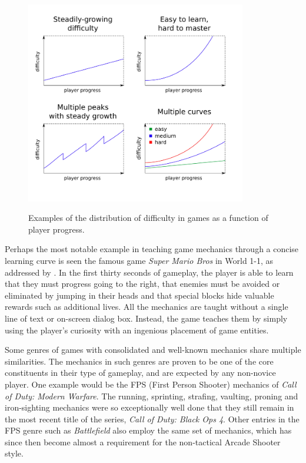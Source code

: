 \begin{figure}
    \begin{center}
    \caption{Examples of the distribution of difficulty in games as a function of player progress.}
        \includegraphics[width=26em]{figures/fig-difficulty-curves.png}
        \label{fig:difficulty-curves}
    \end{center}
\end{figure}

Perhaps the most notable example in teaching game mechanics through a concise learning curve is seen the famous game \emph{Super Mario Bros}  in World 1-1, as addressed by \citet{video_extracreditsmario11}. In the first thirty seconds of gameplay, the player is able to learn that they must progress going to the right, that enemies must be avoided or eliminated by jumping in their heads and that special blocks hide valuable rewards such as additional lives. All the mechanics are taught without a single line of text or on-screen dialog box. Instead, the game teaches them by simply using the player's curiosity with an ingenious placement of game entities.

Some genres of games with consolidated and well-known mechanics share multiple similarities. The mechanics in such genres are proven to be one of the core constituents in their type of gameplay, and are expected by any non-novice player. One example would be the FPS (First Person Shooter) mechanics of \emph{Call of Duty: Modern Warfare}. The running, sprinting, strafing, vaulting, proning and iron-sighting mechanics were so exceptionally well done that they still remain in the most recent title of the series, \emph{Call of Duty: Black Ops 4}. Other entries in the FPS genre such as \emph{Battlefield} also employ the same set of mechanics, which has since then become almost a requirement for the non-tactical Arcade Shooter style.

